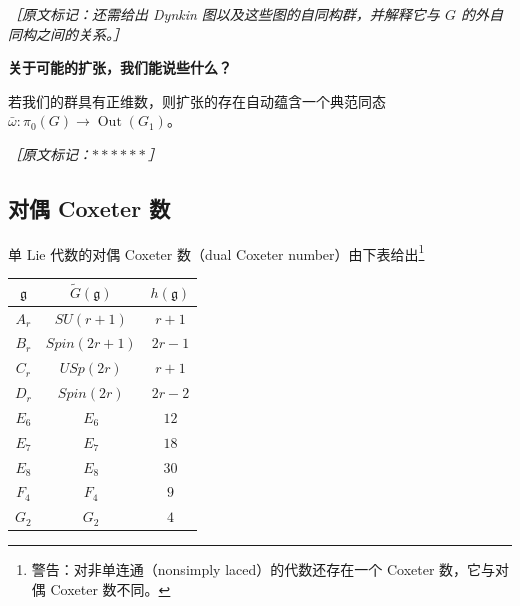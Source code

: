 {\small\itshape ［原文标记：还需给出 Dynkin 图以及这些图的自同构群，并解释它与 $G$ 的外自同构之间的关系。］}

{\bfseries 关于可能的扩张，我们能说些什么？}

若我们的群具有正维数，则扩张的存在自动蕴含一个典范同态 $\bar\omega:\pi_0(G)\to\operatorname{Out}(G_1)$。

{\small\itshape ［原文标记：$\ast\ast\ast\ast\ast\ast$］}

\subsection{对偶 Coxeter 数} %

单 Lie 代数的对偶 Coxeter 数（dual Coxeter number）由下表给出\footnote{警告：对非单连通（nonsimply laced）的代数还存在一个 Coxeter 数，它与对偶 Coxeter 数不同。}

\begin{center}
\begin{tabular}{|c|c|c|}
\hline
$\mathfrak{g}$ & $\widetilde{G}(\mathfrak{g})$ & $h(\mathfrak{g})$\\
\hline
$A_r$ & $SU(r+1)$ & $r+1$\\
$B_r$ & $Spin(2r+1)$ & $2r-1$\\
$C_r$ & $USp(2r)$ & $r+1$\\
$D_r$ & $Spin(2r)$ & $2r-2$\\
$E_6$ & $E_6$ & $12$\\
$E_7$ & $E_7$ & $18$\\
$E_8$ & $E_8$ & $30$\\
$F_4$ & $F_4$ & $9$\\
$G_2$ & $G_2$ & $4$\\
\hline
\end{tabular}
\end{center}


